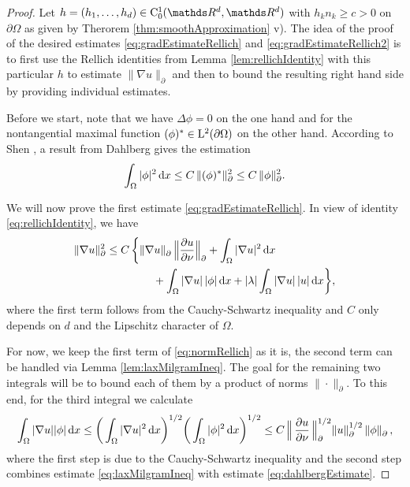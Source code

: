 \begin{proof}
  Let $h = (h_1, \dots, h_d) \in \CC_0^1(\R^d, \R^d)$ with $h_k n_k \geq c > 0$ on $\partial \Omega$ as given by Therorem \ref{thm:smoothApproximation} v). 
  The idea of the proof of the desired estimates \eqref{eq:gradEstimateRellich} and \eqref{eq:gradEstimateRellich2} is to first use the Rellich identities from Lemma \ref{lem:rellichIdentity} with this particular $h$ to estimate $\|\nabla u\|^{}_\partial$ and then to bound the resulting right hand side by providing individual estimates.

  Before we start, note that we have $\Delta \phi = 0$ on the one hand and for the nontangential maximal function $(\phi)^* \in \mathrm{L}^2(\partial\Omega)$ on the other hand. According to Shen \cite[p. 410]{Shen2012}, a result from Dahlberg \cite{dahlberg77} gives the estimation
  \begin{align}
    \label{eq:dahlbergEstimate}
    \int_\Omega |\phi|^2 \, {\operatorname{d}\!{x}} \leq C \, \|(\phi)^* \|_\partial^2 \leq C\, \|\phi\|_\partial^2.
  \end{align}

  We will now prove the first estimate \eqref{eq:gradEstimateRellich}.
  In view of identity \eqref{eq:rellichIdentity}, we have
  \begin{align}
    \label{eq:normRellich}
    \begin{alignedat}{1}
    \|\nabla u\|_\partial^2
      &\leq C \, \bigg\{ \|\nabla u\|^{}_\partial \, \Big\| \frac{\partial u}{\partial \nu} \Big\|^{}_\partial + \int_\Omega |\nabla u|^2 \, {\operatorname{d}\!{x}} \\
    &\hspace{1.5cm}+ \int_\Omega |\nabla u| \, |\phi| \, {\operatorname{d}\!{x}} + |\lambda| \int_\Omega |\nabla u|\, |u| \, {\operatorname{d}\!{x}} \bigg\},
    \end{alignedat}
  \end{align}
  where the first term follows from the Cauchy-Schwartz inequality and $C$ only depends on $d$ and the Lipschitz character of $\Omega$.

  For now, we keep the first term of \eqref{eq:normRellich} as it is, the second term can be handled via Lemma \ref{lem:laxMilgramIneq}. 
  The goal for the remaining two integrals will be to bound each of them by a product of norms $\|\cdot\|^{}_\partial$.
To this end, for the third integral we calculate
  \begin{align}
    \int_\Omega |\nabla u| |\phi| \, {\operatorname{d}\!{x}}
    \leq \bigg( \int_\Omega |\nabla u|^2 \, {\operatorname{d}\!{x}} \bigg)^{1/2} \bigg( \int_\Omega |\phi|^2 \, {\operatorname{d}\!{x}} \bigg)^{1/2}
    \leq C \, \Big\| \, \frac{\partial u}{\partial \nu}\, \Big\|_\partial^{1/2} \|u\|_\partial^{1/2} \, \|\phi\|^{}_\partial\,, \label{eq:nablaPhi}
  \end{align}
  where the first step is due to the Cauchy-Schwartz inequality and the second step combines estimate \eqref{eq:laxMilgramIneq} with estimate \eqref{eq:dahlbergEstimate}.


\end{proof}
